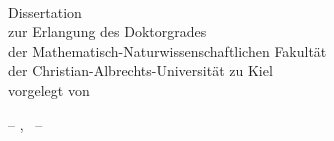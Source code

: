 \begin{titlepage}
\setlength{\hoffset}{0mm}
	\begin{addmargin}[-1cm]{-3cm}
    \begin{center}
        \large  

        \hfill

        \vfill

        \begingroup
            \color{Maroon}\spacedallcaps{\myTitle} \\ 
	\vspace{.6cm}
        \endgroup
	\vspace{1.5cm}
	\vspace{7.2cm}
	\vspace{.6cm}
        \begingroup
            Dissertation\\
	    zur Erlangung des Doktorgrades\\
	    der Mathematisch-Naturwissenschaftlichen Fakult\"at\\
	    der Christian-Albrechts-Universit\"at zu Kiel\\
	    vorgelegt von\\
	\vspace{1.2cm}
        \endgroup     

	\spacedlowsmallcaps{\myName}

        \vfill

        

	\vspace{3cm}
        -- \myLocation, \myTime\ --
        \vfill                      

    \end{center}  
  \end{addmargin}       
\end{titlepage}   